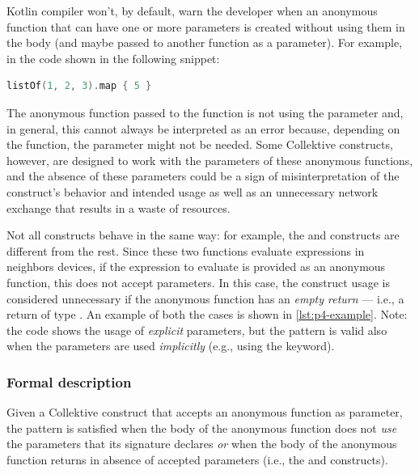 \documentclass[12pt,a4paper,openright,twoside]{book}
\begin{document}
Kotlin compiler won't, by default, warn the developer when an anonymous function
that can have one or more parameters is created without using them in the body 
(and maybe passed to another function as a parameter). For example, in the code
shown in the following snippet:

\begin{lstlisting}[language=Kotlin]
listOf(1, 2, 3).map { 5 }
\end{lstlisting}

The anonymous function passed to the  function is not using the
 parameter and, in general, this cannot always be interpreted as
an error because, depending on the function, the parameter might not be needed.
%
Some Collektive constructs, however, are designed to work with the parameters of
these anonymous functions, and the absence of these parameters could be a sign
of misinterpretation of the construct's behavior and intended usage as well as 
an unnecessary network exchange that results in a waste of resources.

Not all constructs behave in the same way: for example, the
 and  constructs are
different from the rest. Since these two functions evaluate expressions in
neighbors devices, if the expression to evaluate is provided as an anonymous
function, this does not accept parameters. In this case, the construct usage is
considered unnecessary if the anonymous function has an \emph{empty return} ---
i.e., a return of type . 
%
An example of both the cases is shown in \cref{lst:p4-example}. Note: the code 
shows the usage of \emph{explicit} parameters, but the pattern is valid also
when the parameters are used \emph{implicitly} (e.g., using the  keyword).



\subsubsection{Formal description}

Given a Collektive construct that accepts an anonymous function as parameter,
the pattern is satisfied when the body of the anonymous function does not
\emph{use} the parameters that its signature declares \emph{or} when the body of
the anonymous function returns  in absence of accepted parameters
(i.e., the  and  constructs).
\end{document}
